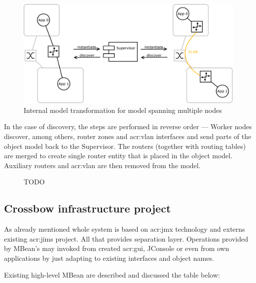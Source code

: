 \documentclass[11pt]{book}
\begin{document}
          \begin{figure}[h]
            \centering
            \includegraphics[width=.9\textwidth]{img/test-case/router.pdf}

            \caption{Internal model transformation for model spanning multiple nodes}
            \label{fig:impl:router}
          \end{figure}

          In the case of discovery, the steps are performed in reverse order --- Worker nodes discover, among others,
          router zones and \gls{acr:vlan} interfaces and send parts of the object model back to the Supervisor. The
          routers (together with routing tables) are merged to create single router entity that is placed in the object
          model. Auxiliary routers and \gls{acr:vlan} are then removed from the model.

          \begin{figure}[h]
            \centering

            \caption{TODO}
            \label{fig:impl:transformation}
          \end{figure}


      \subsection{Crossbow infrastructure project}
      \label{sec:impl:infrastructure}

        As already mentioned whole system is based on \gls{acr:jmx} technology and externs existing \gls{acr:jims}
        project. All that provides separation layer. Operations provided by MBean's may invoked from created
        \gls{acr:gui}, JConsole or even from own applications by just adapting to existing interfaces and object names. 

        Existing high-level MBean are described and discussed the table below:
\end{document}

